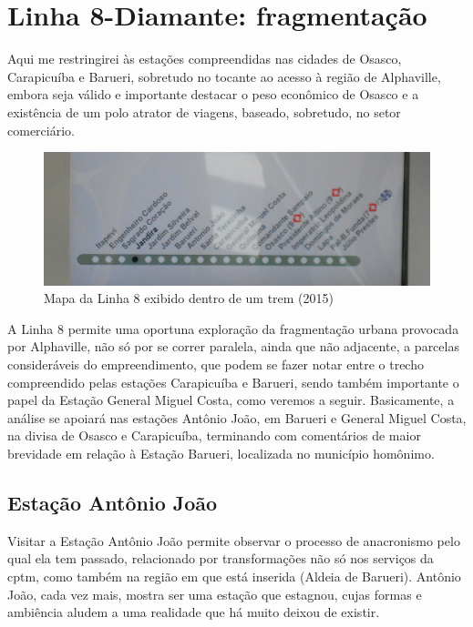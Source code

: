%
%

	\section{Linha 8-Diamante: fragmentação}
	
	Aqui me restringirei às estações compreendidas nas cidades de Osasco, Carapicuíba e Barueri, sobretudo no tocante ao acesso à região de Alphaville, embora seja válido e importante destacar o peso econômico de Osasco e a existência de um polo atrator de viagens, baseado, sobretudo, no setor comerciário.
	
	\begin{figure}[h]
		\caption{Mapa da Linha 8 exibido dentro de um trem (2015)}
		\includegraphics[keepaspectratio,width=\textwidth]{fotos/DSCN8143.JPG}
	\end{figure}
	
	A Linha 8 permite uma oportuna exploração da fragmentação urbana provocada por Alphaville, não só por se correr paralela, ainda que não adjacente, a parcelas consideráveis do empreendimento, que podem se fazer notar entre o trecho compreendido pelas estações Carapicuíba e Barueri, sendo também importante o papel da Estação General Miguel Costa, como veremos a seguir. Basicamente, a análise se apoiará nas estações Antônio João, em Barueri e General Miguel Costa, na divisa de Osasco e Carapicuíba, terminando com comentários de maior brevidade em relação à Estação Barueri, localizada no município homônimo.
	
	\subsection{Estação Antônio João}
	Visitar a Estação Antônio João permite observar o processo de anacronismo pelo qual ela tem passado, relacionado por transformações não só nos serviços da \gls{cptm}, como também na região em que está inserida (Aldeia de Barueri). Antônio João, cada vez mais, mostra ser uma estação que estagnou, cujas formas e ambiência aludem a uma realidade que há muito deixou de existir.
	
